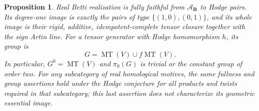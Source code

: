 \documentclass[11pt]{article}
\newtheorem{proposition}[theorem]{Proposition}
\theoremstyle{definition}\newtheorem{definition}[theorem]{Definition}
\theoremstyle{remark}\newtheorem{remark}[theorem]{Remark}
\newcommand{\R}{\mathbf R}\newcommand{\C}{\mathbf C}
\begin{document}
\begin{proposition}\label{prop:real-fullness}
Real Betti realization is fully faithful from $\mathcal A_{\R}$ to Hodge pairs. Its degree-one image is exactly the pairs of type $\{(1,0),(0,1)\}$, and its whole image is their rigid, additive, idempotent-complete tensor closure together with the sign Artin line. For a tensor generator with Hodge homomorphism $h$, its group is
\[
                 G=\operatorname{MT}(V)\cup f\operatorname{MT}(V).
\]
In particular, $G^0=\operatorname{MT}(V)$ and $\pi_0(G)$ is trivial or the constant group of order two. For any subcategory of real homological motives, the same fullness and group assertions hold under the Hodge conjecture for all products and twists required in that subcategory; this last assertion does not characterize its geometric essential image.
\end{proposition}
\end{document}
